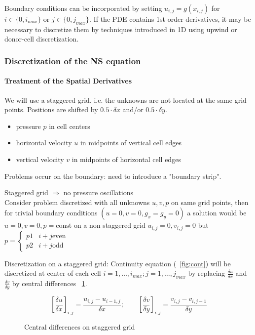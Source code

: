 \documentclass[a4paper,11pt]{scrartcl}
\begin{document}
Boundary conditions can be incorporated by setting $u_{i,j} = g(x_{i,j})$ for $i \in \lbrace 0, i_{max} \rbrace$ or $j \in \lbrace 0,j_{max} \rbrace$. If the PDE contains 1st-order derivatives, it may be necessary to discretize them by techniques introduced in 1D using upwind or donor-cell discretization.

\subsubsection{Discretization of the NS equation}
\paragraph{Treatment of the Spatial Derivatives}
We will use a staggered grid, i.e. the unknowns are not located at the same grid points. Positions are shifted by $0.5 \cdot \delta x$ and/or $0.5 \cdot \delta y$.
\begin{itemize}
	\item pressure $p$ in cell centers
	\item horizontal velocity $u$ in midpoints of vertical cell edges
	\item vertical velocity $v$ in midpoints of horizontal cell edges
\end{itemize}


Problems occur on the boundary: need to introduce a "boundary strip".

Staggered grid $\Rightarrow$ no pressure oscillations\\
Consider problem discretized with all unknowns $u,v,p$ on same grid points, then for trivial boundary conditions $(u = 0, v =0, g_x = g_y = 0)$ a solution would be $u = 0, v = 0, p = \text{const}$ on a non staggered grid $u_{i,j} = 0, v_{i,j} = 0$ but $p = \begin{cases}
p1 & i+j \text{even}\\
p2 & i+j \text{odd}
\end{cases}$

Discretization on a staggered grid: Continuity equation (~\ref{fig:cont}) will be discretized at center of each cell $i = 1, \dots, i_{max}; j = 1, \dots, j_{max}$ by replacing $\frac{\delta u}{\delta x}$ and $\frac{\delta v}{\delta y}$ by central differences ~\ref{fig:dif-cen-stag}.

\begin{figure}[H]
	\centering
	\[ \left[ \frac{\delta u}{\delta x}\right]_{i,j} = \frac{u_{i,j} - u_{i-1,j}}{\delta x}; \qquad  \left[ \frac{\delta v}{\delta y}\right]_{i,j} = \frac{v_{i,j} - v_{i,j-1}}{\delta y} \]
	\renewcommand{\thefigure}{3.16}
	\caption{Central differences on staggered grid}
	\label{fig:dif-cen-stag}
\end{figure}
\end{document}
